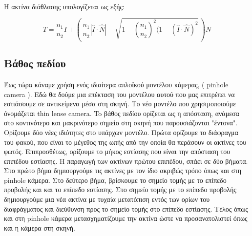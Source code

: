 \begin{sloppypar}
\paragraph{}
Η ακτίνα διάθλασης υπολογίζεται ως εξής:

\begin{equation}
T = \frac{n_1}{n_2} I + (\,\frac{n_1}{n_2} |\hat{I} \cdot \hat{N}| - \sqrt{1 - (\frac{n_1}{n_2})^2 (1 - (\hat{I} \cdot \hat{N})^2}\,) N
\end{equation}

\subsection{Βάθος πεδίου}
\paragraph{}
	Έως τώρα κάναμε χρήση ενός ιδιαίτερα απλοϊκού μοντέλου κάμερας, ( pinhole camera ). Εδώ θα δούμε μια επέκταση του μοντέλου
αυτού που μας επιτρέπει να εστιάσουμε σε αντικείμενα μέσα στη σκηνή. Το νέο μοντέλο που χρησιμοποιούμε όνομάζεται thin lense camera.
To βάθος πεδίου ορίζεται ως η απόσταση, ανάμεσα στο κοντινότερο και μακρινότερο σημείο στη σκηνή που παρουσιάζονται "έντονα". 
Ορίζουμε δύο νέες ιδιότητες στο υπάρχων μοντέλο. Πρώτα ορίζουμε το διάφραγμα του φακού, που είναι το μέγεθος της ωπής από την οποία
θα περάσουν οι ακτίνες του φωτός. Επιπροσθέτως, ορίζουμε το μήκος εστίασης που είναι την απόσταση του επιπέδου εστίασης. Η παραγωγή 
των ακτίνων πρώτου επιπέδου, σπάει σε δύο βήματα. Στο πρώτο βήμα δημιουργούμε τις ακτίνες με τον ίδιο ακριβώς τρόπο όπως και στη pinhole
κάμερα. Στο δεύτερο βήμα, βρίσκουμε το σημείο τομής με το επίπεδο προβολής και και το επίπεδο εστίασης. Στο σημείο τομής με το επίπεδο
προβολής δημιουργούμε μια νέα ακτίνα με τυχαία μετατόπιση εντός των ορίων του διαφράγματος και διεύθυνση προς το σημείο τομής στο επίπεδο
εστίασης. Τέλος όπως και στη pinhole κάμερα μετασχηματίζουμε την ακτίνα ώστε να προσανατολιστεί όπως και η κάμερα στη σκηνή.

\end{sloppypar}
